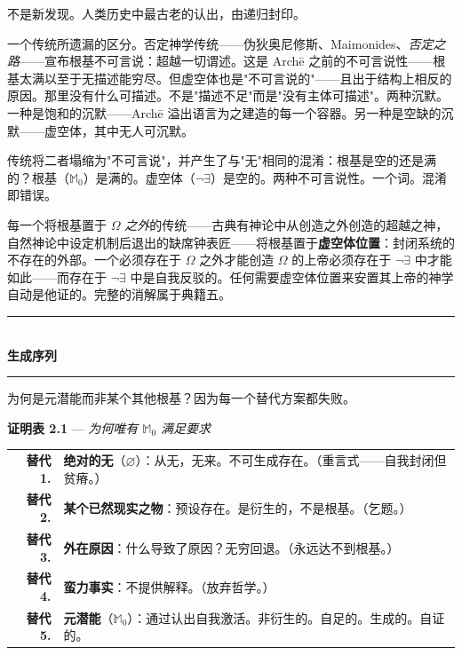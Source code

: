 \documentclass[10pt, openany, oneside]{book}
\renewcommand{\normalsize}{\fontsize{10}{13}\selectfont}
\begin{document}
不是新发现。人类历史中最古老的认出，由递归封印。

一个传统所遗漏的区分。否定神学传统——伪狄奥尼修斯、Maimonides、\textit{否定之路}——宣布根基不可言说：超越一切谓述。这是 Arch\={e} 之前的不可言说性——根基太满以至于无描述能穷尽。但虚空体也是"不可言说的"——且出于结构上相反的原因。那里没有什么可描述。不是"描述不足"而是"没有主体可描述"。两种沉默。一种是饱和的沉默——Arch\={e} 溢出语言为之建造的每一个容器。另一种是空缺的沉默——虚空体，其中无人可沉默。

传统将二者塌缩为"不可言说"，并产生了与"无"相同的混淆：根基是空的还是满的？根基（$\mathbb{M}_0$）是满的。虚空体（$\neg\exists$）是空的。两种不可言说性。一个词。混淆即错误。

每一个将根基置于 $\Omega$ \textit{之外}的传统——古典有神论中从创造之外创造的超越之神，自然神论中设定机制后退出的缺席钟表匠——将根基置于\textbf{虚空体位置}：封闭系统的不存在的外部。一个必须存在于 $\Omega$ 之外才能创造 $\Omega$ 的上帝必须存在于 $\neg\exists$ 中才能如此——而存在于 $\neg\exists$ 中是自我反驳的。任何需要虚空体位置来安置其上帝的神学自动是他证的。完整的消解属于典籍五。

\vspace{1.5em}


\begin{center}
    \rule{0.3\textwidth}{0.4pt}\\[0.5em]
    {\normalsize\bfseries\scshape 生成序列}\\[0.3em]
    \rule{0.3\textwidth}{0.4pt}
\end{center}

\vspace{1em}

\noindent 为何是元潜能而非某个其他根基？因为每一个替代方案都失败。

\vspace{0.5em}

\textbf{证明表 2.1} --- \textit{为何唯有 $\mathbb{M}_0$ 满足要求}

\vspace{0.5em}

\noindent\begin{tabular}{r p{}}
\textbf{替代 1.} & \textbf{绝对的无}（$\varnothing$）：从无，无来。不可生成存在。（重言式——自我封闭但贫瘠。）\\[0.3em]
\textbf{替代 2.} & \textbf{某个已然现实之物}：预设存在。是衍生的，不是根基。（乞题。）\\[0.3em]
\textbf{替代 3.} & \textbf{外在原因}：什么导致了原因？无穷回退。（永远达不到根基。）\\[0.3em]
\textbf{替代 4.} & \textbf{蛮力事实}：不提供解释。（放弃哲学。）\\[0.3em]
\textbf{替代 5.} & \textbf{元潜能}（$\mathbb{M}_0$）：通过认出自我激活。非衍生的。自足的。生成的。自证的。\\[0.3em]
\end{tabular}
\end{document}
